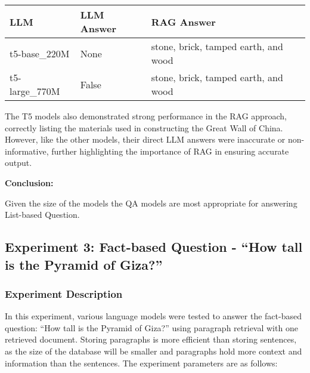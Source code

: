 \documentclass[11pt]{wseas}
\begin{document}
\begin{longtable}[]{@{}
  >{\raggedright\arraybackslash}p{}
  >{\raggedright\arraybackslash}p{}
  >{\raggedright\arraybackslash}p{}@{}}
\toprule\noalign{}
\begin{minipage}[b]{\linewidth}\raggedright
LLM
\end{minipage} & \begin{minipage}[b]{\linewidth}\raggedright
LLM Answer
\end{minipage} & \begin{minipage}[b]{\linewidth}\raggedright
RAG Answer
\end{minipage} \\
\midrule\noalign{}
\endhead
\bottomrule\noalign{}
\endlastfoot
t5-base\_220M & None & stone, brick, tamped earth, and wood \\
t5-large\_770M & False & stone, brick, tamped earth, and wood \\
\end{longtable}

The T5 models also demonstrated strong performance in the RAG approach,
correctly listing the materials used in constructing the Great Wall of
China. However, like the other models, their direct LLM answers were
inaccurate or non-informative, further highlighting the importance of
RAG in ensuring accurate output.

\textbf{Conclusion:}

Given the size of the models the QA models are most appropriate for
answering List-based Question.

    \newpage

\subsection{Experiment 3: Fact-based Question - ``How tall is the
Pyramid of
Giza?''}\label{experiment-3-fact-based-question---how-tall-is-the-pyramid-of-giza}

\subsubsection{Experiment Description}\label{experiment-description}

In this experiment, various language models were tested to answer the
fact-based question: ``How tall is the Pyramid of Giza?'' using
paragraph retrieval with one retrieved document. Storing paragraphs is
more efficient than storing sentences, as the size of the database will
be smaller and paragraphs hold more context and information than the
sentences. The experiment parameters are as follows:
\end{document}
